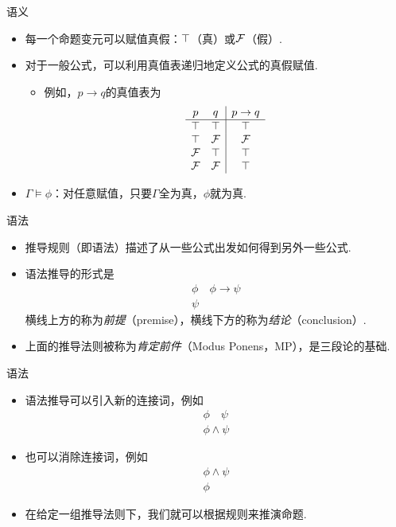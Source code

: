 \begin{frame}{语义}
\begin{itemize}
    \item 每一个命题变元可以赋值真假：$\top$（真）或$\mathcal{F}$（假）.
    \item 对于一般公式，可以利用真值表递归地定义公式的真假赋值.
    \begin{itemize}
        \item 例如，$p\to q$的真值表为
        \[\begin{array}{cc|c}
        p&q&p\to q\\\hline
             \top&\top&\top  \\
             \top&\mathcal{F}&\mathcal{F}  \\
             \mathcal{F}&\top&\top  \\
             \mathcal{F}&\mathcal{F}&\top  \\
        \end{array}\]
    \end{itemize}
    \item $\Gamma\models\phi$：对任意赋值，只要$\Gamma$全为真，$\phi$就为真.
\end{itemize}
\end{frame}

\begin{frame}{语法}
\begin{itemize}
    \item 推导规则（即语法）描述了从一些公式出发如何得到另外一些公式.
    \item 语法推导的形式是
    \[\begin{array}{c}
         \phi\quad\phi\to\psi  \\\hline
         \psi
    \end{array}\]
    横线上方的称为\emph{前提}（premise），横线下方的称为\emph{结论}（conclusion）.
    \item 上面的推导法则被称为\emph{肯定前件}（Modus Ponens，MP），是三段论的基础.
\end{itemize}
\end{frame}

\begin{frame}{语法}
\begin{itemize}
    \item 语法推导可以引入新的连接词，例如
    \[\begin{array}{c}
         \phi\quad\psi  \\\hline
         \phi\wedge\psi
    \end{array}\]
    \item 也可以消除连接词，例如
    \[\begin{array}{c}
         \phi\wedge\psi  \\\hline
         \phi
    \end{array}\]
    \item 在给定一组推导法则下，我们就可以根据规则来推演命题.
\end{itemize}
\end{frame}

